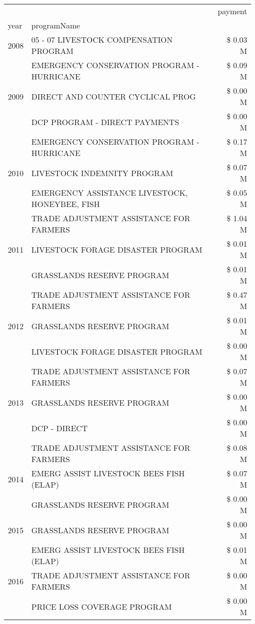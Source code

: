 \begin{tabular}{llr}
\toprule
 &  & payment \\
year & programName &  \\
\midrule
2008 & 05 - 07 LIVESTOCK COMPENSATION PROGRAM & \$ 0.03 M \\
\cline{1-3}
\multirow[t]{3}{*}{2009} & EMERGENCY CONSERVATION PROGRAM - HURRICANE & \$ 0.09 M \\
 & DIRECT AND COUNTER CYCLICAL PROG & \$ 0.00 M \\
 & DCP PROGRAM - DIRECT PAYMENTS & \$ 0.00 M \\
\cline{1-3}
\multirow[t]{3}{*}{2010} & EMERGENCY CONSERVATION PROGRAM - HURRICANE & \$ 0.17 M \\
 & LIVESTOCK INDEMNITY PROGRAM & \$ 0.07 M \\
 & EMERGENCY ASSISTANCE LIVESTOCK, HONEYBEE, FISH & \$ 0.05 M \\
\cline{1-3}
\multirow[t]{3}{*}{2011} & TRADE ADJUSTMENT ASSISTANCE FOR FARMERS & \$ 1.04 M \\
 & LIVESTOCK FORAGE DISASTER PROGRAM & \$ 0.01 M \\
 & GRASSLANDS RESERVE PROGRAM & \$ 0.01 M \\
\cline{1-3}
\multirow[t]{3}{*}{2012} & TRADE ADJUSTMENT ASSISTANCE FOR FARMERS & \$ 0.47 M \\
 & GRASSLANDS RESERVE PROGRAM & \$ 0.01 M \\
 & LIVESTOCK FORAGE DISASTER PROGRAM & \$ 0.00 M \\
\cline{1-3}
\multirow[t]{3}{*}{2013} & TRADE ADJUSTMENT ASSISTANCE FOR FARMERS & \$ 0.07 M \\
 & GRASSLANDS RESERVE PROGRAM & \$ 0.00 M \\
 & DCP - DIRECT & \$ 0.00 M \\
\cline{1-3}
\multirow[t]{3}{*}{2014} & TRADE ADJUSTMENT ASSISTANCE FOR FARMERS & \$ 0.08 M \\
 & EMERG ASSIST LIVESTOCK BEES FISH (ELAP) & \$ 0.07 M \\
 & GRASSLANDS RESERVE PROGRAM & \$ 0.00 M \\
\cline{1-3}
2015 & GRASSLANDS RESERVE PROGRAM & \$ 0.00 M \\
\cline{1-3}
\multirow[t]{3}{*}{2016} & EMERG ASSIST LIVESTOCK BEES FISH (ELAP) & \$ 0.01 M \\
 & TRADE ADJUSTMENT ASSISTANCE FOR FARMERS & \$ 0.00 M \\
 & PRICE LOSS COVERAGE PROGRAM & \$ 0.00 M \\
\cline{1-3}

\end{tabular}

